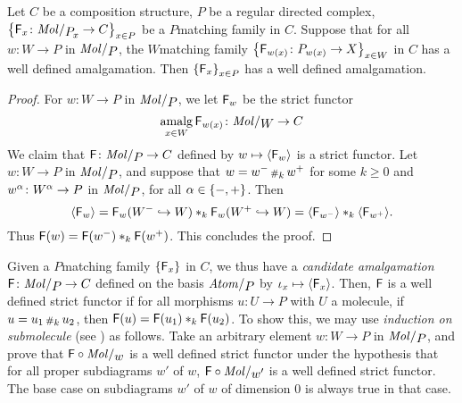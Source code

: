 \begin{lem} \label{lem:well_define_from_regular_iff_well_defined_from_molecules}
    Let \( C \) be a composition structure, \( P \) be a regular directed complex, \( \set{\F_x \colon \molecin{\imel{P}{x}} \to C}_{x \in P} \) be a \( P \)\nbd matching family in \( C \). 
    Suppose that for all \( w \colon W \to P \) in \( \molecin{P} \), the \( W \)\nbd matching family \( \left\{ {\mathsf{F}_{w(x)} \colon {P}_{w(x)} \to X} \right\}_{x \in W} \) in \( C \) has a well defined amalgamation.
    Then \( \left\{ {\mathsf{F}_x} \right\}_{x \in P} \) has a well defined amalgamation.
\end{lem}
\begin{proof}
    For \( w \colon W \to P \) in \( \molecin{P} \), we let \( \mathsf{F}_w \) be the strict functor 
    \begin{equation*}
        \amalg_{x \in W} \F_{w(x)} \colon \molecin{W} \to C
    \end{equation*}
    We claim that \( \F \colon \molecin{P} \to C \) defined by \( w \mapsto \langle\mathsf{F}_w\rangle \) is a strict functor.
    Let \( w \colon W \to P \) in \( \molecin{P} \), and suppose that \( w = w^- \,{\scriptstyle\#}_{k}\, w^+ \) for some \( k \geq 0 \) and \( w^\alpha \colon W^\alpha \to P \) in \( \molecin{P} \), for all \( \alpha \in \left\{ {-, +} \right\} \).
    Then
    \begin{equation*}
        \langle\mathsf{F}_w\rangle = \mathsf{F}_w(W^- \hookrightarrow W) *_{k} \mathsf{F}_w(W^+ \hookrightarrow W) = \langle\mathsf{F}_{w^-}\rangle *_{k} \langle\mathsf{F}_{w^+}\rangle.
    \end{equation*}
    Thus \( \mathsf{F}(w) = \mathsf{F}(w^-) *_{k} \mathsf{F}(w^+) \).
    This concludes the proof.
\end{proof}

\begin{comm} \label{comm:well_defined_amalgamation}
    Given a \( P \)\nbd matching family \( \left\{ {\mathsf{F}_x} \right\} \) in \( C \), we thus have a \emph{candidate amalgamation} \( \F \colon \molecin{P} \to C \) defined on the basis \( \atomin{P} \) by \( \iota_{x} \mapsto \langle\mathsf{F}_x\rangle \).
    Then, \( \mathsf{F} \) is a well defined strict functor if for all morphisms \( u \colon U \to P \) with \( U \) a molecule, if \( u = u_1 \,{\scriptstyle\#}_{k}\, u_2 \), then \( \mathsf{F}(u) = \mathsf{F}(u_1) *_{k} \mathsf{F}(u_2) \).
    To show this, we may use \emph{induction on submolecule} (see \cite[Comment 4.1.7]{hadzihasanovic2024combinatorics}) as follows.
    Take an arbitrary element \( w \colon W \to P \) in \( \molecin{P} \), and prove that \( \F \after \molecin{w} \) is a well defined strict functor under the hypothesis that for all proper subdiagrams \( w' \) of \( w \), \( \F \after \molecin{w'} \) is a well defined strict functor.
    The base case on subdiagrams \( w' \) of \( w \) of dimension \( 0 \) is always true in that case. 
\end{comm}

